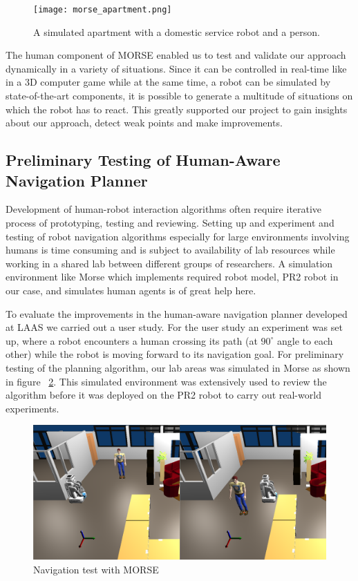 \documentclass[conference]{IEEEtran}
\begin{document}
\begin{figure}[H]
      \centering
      \texttt{[image: morse\_apartment.png]}
      \caption{A simulated apartment with a domestic service robot and a person.}
      \label{fig|apartment}
\end{figure}

The human component of MORSE enabled us to test and validate our approach
dynamically in a variety of situations. Since it can be controlled in real-time
like in a 3D computer game while at the same time, a robot can be simulated by
state-of-the-art components, it is possible to generate a multitude of
situations on which the robot has to react. This greatly supported our project
to gain insights about our approach, detect weak points and make improvements.

\subsection{Preliminary Testing of Human-Aware Navigation Planner}
\label{sc:navigation}

Development of human-robot interaction algorithms often require iterative
process of prototyping, testing and reviewing. Setting up and experiment and
testing of robot navigation algorithms especially for large environments
involving humans is time consuming and is subject to availability of lab
resources while working in a shared lab between different groups of
researchers. A simulation environment like Morse which implements required robot
model, PR2 robot in our case, and simulates human agents is of great help here.

To evaluate the improvements in the human-aware navigation planner developed at
LAAS we carried out a user study. For the user study an experiment was set up,
where a robot encounters a human crossing its path (at $90^{\circ }$ angle to
each other) while the robot is moving forward to its navigation goal. For
preliminary testing of the planning algorithm, our lab areas was simulated in
Morse as shown in figure ~\ref{fig|hanp}. This simulated environment was
extensively used to review the algorithm before it was deployed on the PR2 robot
to carry out real-world
experiments. %

\begin{figure}[H]
      \centering
      \includegraphics[width=0.9\linewidth]{morsehanp.png}
      \caption{Navigation test with MORSE}
      \label{fig|hanp}
\end{figure}
\end{document}
